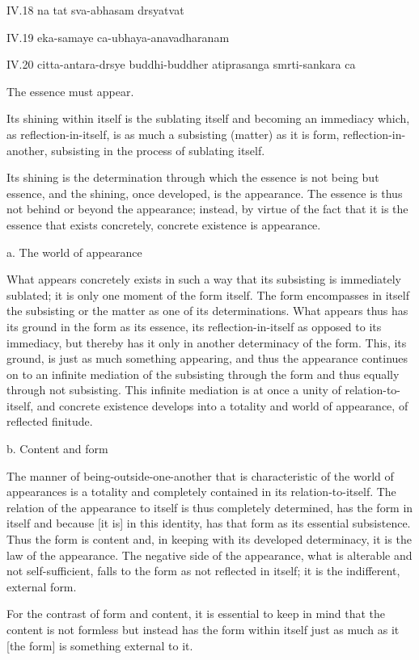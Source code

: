 IV.18
na tat sva-abhasam drsyatvat

IV.19
eka-samaye ca-ubhaya-anavadharanam

IV.20
citta-antara-drsye buddhi-buddher atiprasanga smrti-sankara ca

The essence must appear.

Its shining within itself is
the sublating itself and
becoming an immediacy which,
as reflection-in-itself, is
as much a subsisting (matter)
as it is form, reflection-in-another,
subsisting in the process of sublating itself.

Its shining is the determination through which
the essence is not being but essence,
and the shining, once developed, is the appearance.
The essence is thus not behind or beyond the appearance;
instead, by virtue of the fact that it is
the essence that exists concretely,
concrete existence is appearance.

a. The world of appearance

What appears concretely exists in such a way
that its subsisting is immediately sublated;
it is only one moment of the form itself.
The form encompasses in itself the subsisting
or the matter as one of its determinations.
What appears thus has its ground in the form
as its essence, its reflection-in-itself
as opposed to its immediacy, but thereby has it
only in another determinacy of the form.
This, its ground, is just as much something appearing,
and thus the appearance continues on to an infinite mediation
of the subsisting through the form
and thus equally through not subsisting.
This infinite mediation is at once
a unity of relation-to-itself,
and concrete existence develops into a totality
and world of appearance, of reflected finitude.

b. Content and form

The manner of being-outside-one-another that is
characteristic of the world of appearances is
a totality and completely contained in its relation-to-itself.
The relation of the appearance to itself is
thus completely determined, has the form in itself
and because [it is] in this identity,
has that form as its essential subsistence.
Thus the form is content and,
in keeping with its developed determinacy,
it is the law of the appearance.
The negative side of the appearance,
what is alterable and not self-sufficient,
falls to the form as not reflected in itself;
it is the indifferent, external form.

    For the contrast of form and content,
    it is essential to keep in mind that
    the content is not formless but
    instead has the form within itself
    just as much as it [the form] is
    something external to it.


